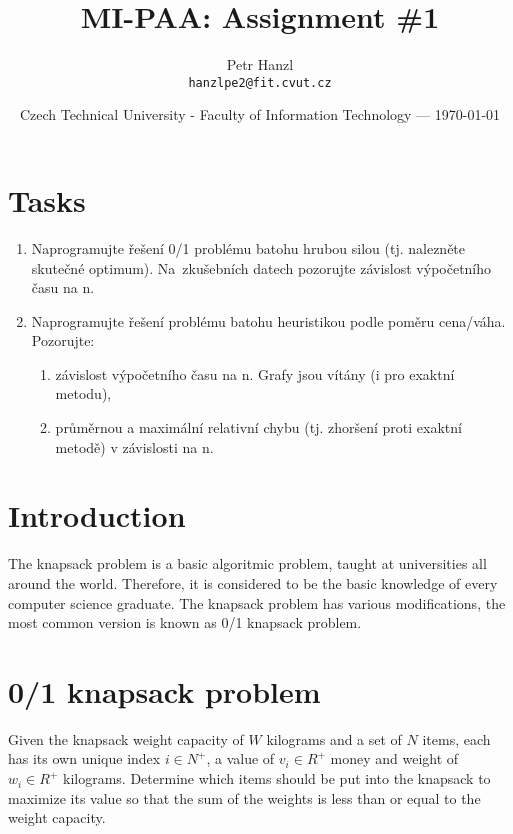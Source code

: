 \documentclass{article}
\title{MI-PAA: Assignment \#1} %
\author{Petr Hanzl\\ \texttt{hanzlpe2@fit.cvut.cz}} %
\date{Czech Technical University - Faculty of Information Technology --- \today} %
\begin{document}
\maketitle %

\section*{Tasks}
	\begin{enumerate}
		\item Naprogramujte řešení 0/1 problému batohu hrubou silou (tj. nalezněte skutečné optimum). Na~zkušebních datech pozorujte závislost výpočetního času na n.

		\item Naprogramujte řešení problému batohu heuristikou podle poměru cena/váha. Pozorujte:
		\begin{enumerate}
			\item závislost výpočetního času na n. Grafy jsou vítány (i pro exaktní metodu),
			\item průměrnou a maximální relativní chybu (tj. zhoršení proti exaktní metodě) v závislosti na n.
		\end{enumerate}
	\end{enumerate}

\hrulefill
\section*{Introduction} %

The knapsack problem is a basic algoritmic problem, taught at universities all around the world. Therefore, it is considered to be the basic knowledge of every computer science graduate. The knapsack problem has various modifications, the most common version is known as 0/1 knapsack problem.


\section*{0/1 knapsack problem} %

 Given the knapsack weight capacity of $W$ kilograms and a set of $N$ items, each has its own unique index $i \in N^+$, a value of $v_i \in R^+$ money and weight of $w_i \in R^+$ kilograms. Determine which items should be put into the knapsack to maximize its value so that the sum of the weights is less than or equal to the weight capacity.
\end{document}

